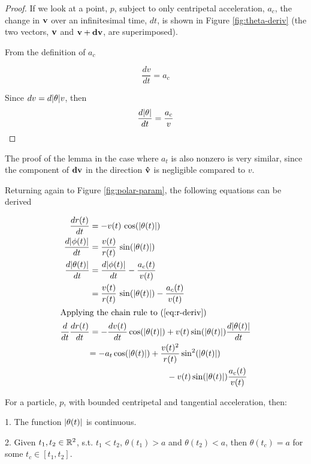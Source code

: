 \begin{proof}

If we look at a point, $p$, subject to only centripetal acceleration, $a_c$, the change in $\mathbf{v}$ over an infinitesimal time, $dt$, is shown in Figure \ref{fig:theta-deriv} (the two vectors, $\mathbf{v}$ and $\mathbf{v}+\mathbf{dv}$, are superimposed). 


From the definition of $a_c$

\[
\frac{dv}{dt} = a_c
\]

Since $dv = d\abs{\theta} v$, then
\[
\frac{d\abs{\theta}}{dt} = \frac{a_c}{v}
\]
\end{proof}

The proof of the lemma in the case where $a_t$ is also nonzero is very similar, since the component of $\mathbf{dv}$ in the direction $\mathbf{\hat{v}}$ is negligible compared to $v$.

Returning again to Figure \ref{fig:polar-param}, the following equations can be derived

\begin{align}
  \frac{dr(t)}{dt}& = -v(t) \, \cos\paren{\abs{\theta(t)}}\label{eq:r-deriv}\\
  \frac{d\abs{\phi(t)}}{dt}& = \frac{v(t)}{r(t)} \, \sin\paren{\abs{\theta(t)}}\label{eq:phi-deriv}\\
  \frac{d\abs{\theta(t)}}{dt}& = \frac{d\abs{\phi(t)}}{dt} - \frac{a_c(t)}{v(t)}\\
  &= \frac{v(t)}{r(t)} \, \sin\paren{\abs{\theta(t)}} - \frac{a_c(t)}{v(t)}\label{eq:theta-deriv}\\
  \intertext{Applying the chain rule to (\ref{eq:r-deriv})}
  \frac{d}{dt} \frac{dr(t)}{dt}& = -\frac{dv(t)}{dt} \cos\paren{\abs{\theta(t)}} + v(t) \sin\paren{\abs{\theta(t)}} \frac{d\abs{\theta(t)}}{dt}\\
  &\begin{aligned}
    = -a_t \cos\paren{\abs{\theta(t)}} &+ \frac{v(t)^2}{r(t)} \sin^2\paren{\abs{\theta(t)}}\\
    &\qquad - v(t) \sin\paren{\abs{\theta(t)}} \frac{a_c(t)}{v(t)}\label{eq:r-deriv-2}
  \end{aligned}
\end{align}

\begin{lemma}\label{lemma:intermediate-theta}
  For a particle, $p$, with bounded centripetal and tangential acceleration, then: 

  1. The function $\abs{\theta(t)}$ is continuous. 

  2. Given $t_1, t_2 \in \mathbb R^2$, s.t. $t_1 < t_2$, $\theta(t_1) > a$ and $\theta(t_2) < a$, then $\theta(t_c) = a$ for some $t_c \in [t_1, t_2]$.
\end{lemma}

